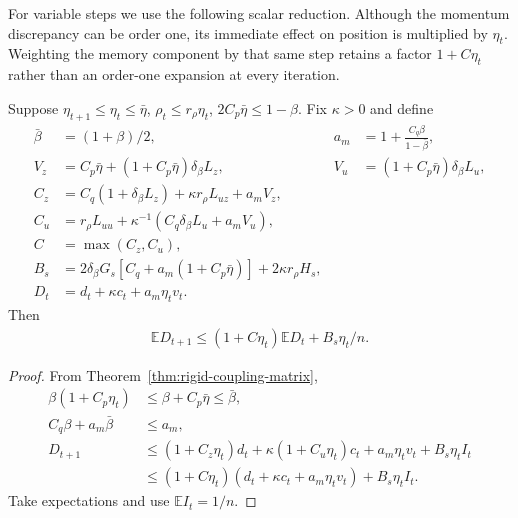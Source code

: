 For variable steps we use the following scalar reduction. Although the momentum discrepancy can be order one, its immediate effect on position is multiplied by $\eta_t$. Weighting the memory component by that same step retains a factor $1+C\eta_t$ rather than an order-one expansion at every iteration.

\begin{lemma}
\label{lem:stability-eliminate}
Suppose $\eta_{t+1}\le\eta_t\le\bar\eta$, $\rho_t\le r_\rho\eta_t$,
$2C_p\bar\eta\le1-\beta$. Fix $\kappa>0$ and define
\begin{align}
 \bar\beta&=(1+\beta)/2,&
 a_m&=1+\frac{C_q\beta}{1-\bar\beta},\\
 V_z&=C_p\bar\eta+(1+C_p\bar\eta)\delta_\beta L_z,&
 V_u&=(1+C_p\bar\eta)\delta_\beta L_u,\\
 C_z&=C_q(1+\delta_\beta L_z)+\kappa r_\rho L_{uz}+a_mV_z,\\
 C_u&=r_\rho L_{uu}+\kappa^{-1}(C_q\delta_\beta L_u+a_mV_u),\\
 C&=\max(C_z,C_u),\\
 B_s&=2\delta_\beta G_s[C_q+a_m(1+C_p\bar\eta)]+2\kappa r_\rho H_s,\\
 D_t&=d_t+\kappa c_t+a_m\eta_tv_t.
\end{align}
Then
\begin{align}\label{eq:coupled-fixed}
 \mathbb ED_{t+1}\le(1+C\eta_t)\mathbb ED_t+B_s\eta_t/n.
\end{align}
\end{lemma}
\begin{proof}
From Theorem~\ref{thm:rigid-coupling-matrix},
\begin{align}
 \beta(1+C_p\eta_t)&\le\beta+C_p\bar\eta\le\bar\beta,\\
 C_q\beta+a_m\bar\beta&\le a_m,\\
 D_{t+1}
 &\le(1+C_z\eta_t)d_t+
 \kappa(1+C_u\eta_t)c_t+a_m\eta_tv_t+B_s\eta_tI_t\\
 &\le(1+C\eta_t)(d_t+\kappa c_t+a_m\eta_tv_t)+B_s\eta_tI_t.
\end{align}
Take expectations and use $\mathbb EI_t=1/n$.
\end{proof}

